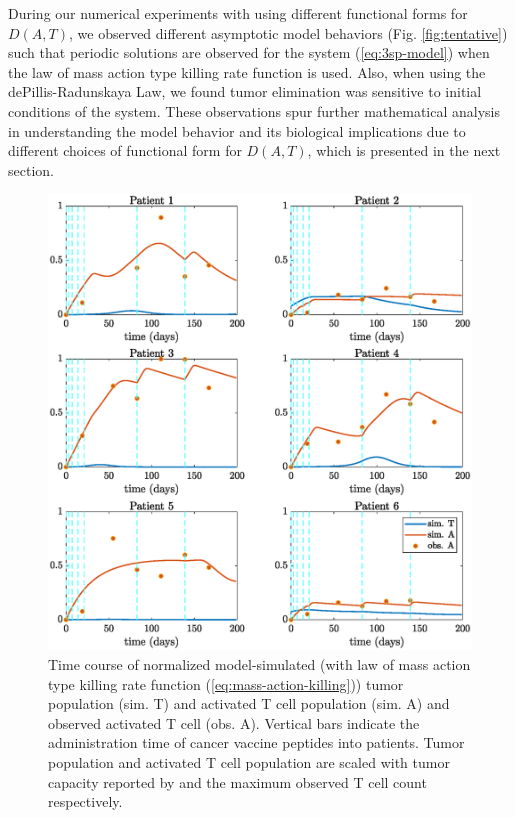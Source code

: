 \documentclass[review,authoryear]{elsarticle}
\begin{document}
During our numerical experiments with using different functional forms for $D(A,T)$, we observed different asymptotic model behaviors (Fig. \ref{fig:tentative}) such that periodic solutions are observed for the system (\ref{eq:3sp-model}) when the law of mass action type killing rate function is used. Also, when using the dePillis-Radunskaya Law, we found tumor elimination was sensitive to initial conditions of the system. These observations spur further mathematical analysis in understanding the model behavior and its biological implications due to different choices of functional form for $D(A,T)$, which is presented in the next section. 

\begin{figure}[!h]
\centerline{\includegraphics[width=0.7\paperwidth]{figs/pat1-6fitting}}\caption{Time course of normalized model-simulated (with law of mass action type killing rate function (\ref{eq:mass-action-killing})) tumor population (sim. T) and activated T cell population (sim. A) and observed activated T cell (obs. A). Vertical bars indicate the administration time of cancer vaccine peptides into patients. Tumor population and activated T cell population are scaled with tumor capacity reported by \citet{Messan2021} and the maximum observed T cell count respectively.  \label{fig:data-fitting.}}
\end{figure}
\end{document}
